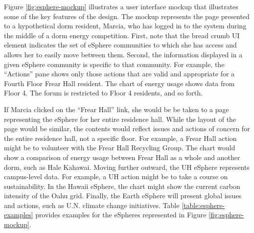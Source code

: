 Figure \ref{fig:esphere-mockup} illustrates a user interface mockup that
illustrates some of the key features of the design.  The mockup represents
the page presented to a hypothetical dorm resident, Marcia, who has logged
in to the system during the middle of a dorm energy competition.  First,
note that the bread crumb UI element indicates the set of eSphere
communities to which she has access and allows her to easily move between
them.  Second, the information displayed in a given eSphere community is
specific to that community.  For example, the ``Actions'' pane shows only
those actions that are valid and appropriate for a Fourth Floor Frear Hall
resident.  The chart of energy usage shows data from Floor 4.  The forum is
restricted to Floor 4 residents, and so forth.  

If Marcia clicked on the ``Frear Hall'' link, she would be be taken to a
page representing the eSphere for her entire residence hall.  While the
layout of the page would be similar, the contents would reflect issues and
actions of concern for the entire residence hall, not a specific floor. 
For example, a Frear Hall action might be to volunteer with the Frear Hall
Recycling Group.   The chart would show a comparison of energy usage
between Frear Hall as a whole and another dorm, such as Hale Kahawai. 
Moving further outward, the UH eSphere represents campus-level data. For
example, a UH action might be to take a course on sustainability.  
In the Hawaii eSphere, the chart might show the current carbon intensity of
the Oahu grid.  Finally, the Earth eSphere will present global issues and
actions, such as U.N. climate change initiatives. Table
\ref{table:esphere-examples} provides examples for the eSpheres represented
in Figure \ref{fig:esphere-mockup}.

